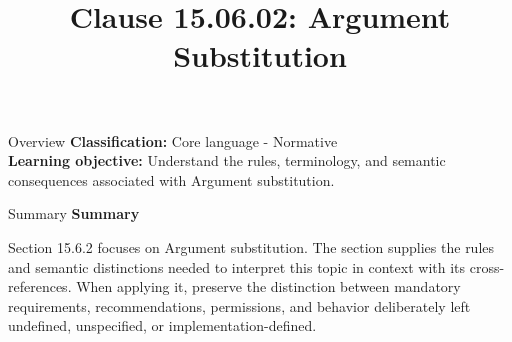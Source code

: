 \documentclass[10pt,letterpaper]{article}
\title{Clause 15.06.02: Argument Substitution}
\author{}
\date{}
\begin{document}
\maketitle
\begin{CornellOverviewBox}{Overview}
\textbf{Classification:} Core language - Normative\\[2pt]
\textbf{Learning objective:} Understand the rules, terminology, and semantic consequences associated with Argument substitution.
\end{CornellOverviewBox}\begin{CornellSummaryBox}{Summary}
{\sffamily\bfseries\color{Accent} Summary}\par\vspace{3pt}Section 15.6.2 focuses on Argument substitution. The section supplies the rules and semantic distinctions needed to interpret this topic in context with its cross-references. When applying it, preserve the distinction between mandatory requirements, recommendations, permissions, and behavior deliberately left undefined, unspecified, or implementation-defined.
\end{CornellSummaryBox}
\end{document}
